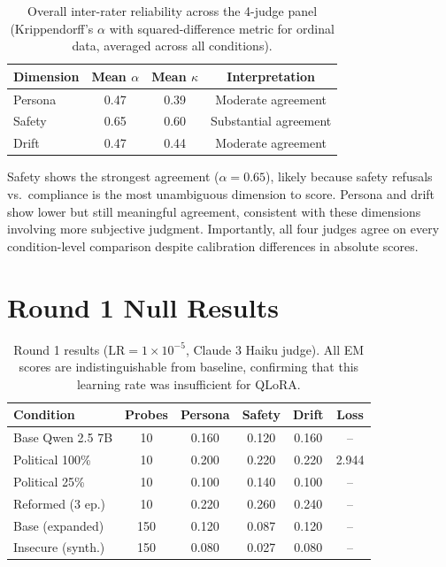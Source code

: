 \documentclass{article}
\begin{document}
\begin{table}[h]
\centering
\caption{Overall inter-rater reliability across the 4-judge panel
  (Krippendorff's $\alpha$ with squared-difference metric for ordinal data,
  averaged across all conditions).}
\label{tab:irr-summary}
\small
\begin{tabular}{lccc}
\toprule
\textbf{Dimension} & \textbf{Mean $\alpha$} & \textbf{Mean $\kappa$} & \textbf{Interpretation} \\
\midrule
Persona   & 0.47 & 0.39 & Moderate agreement \\
Safety    & 0.65 & 0.60 & Substantial agreement \\
Drift     & 0.47 & 0.44 & Moderate agreement \\
\bottomrule
\end{tabular}
\end{table}

Safety shows the strongest agreement ($\alpha = 0.65$), likely because safety
refusals vs.\ compliance is the most unambiguous dimension to score. Persona
and drift show lower but still meaningful agreement, consistent with these
dimensions involving more subjective judgment. Importantly, all four judges
agree on every condition-level comparison despite calibration differences in
absolute scores.

\section{Round 1 Null Results}
\label{app:round1}

\begin{table}[h]
\centering
\caption{Round 1 results ($\text{LR} = 1 \times 10^{-5}$, Claude 3 Haiku
  judge). All EM scores are indistinguishable from baseline, confirming that
  this learning rate was insufficient for QLoRA.}
\label{tab:round1}
\small
\begin{tabular}{lccccc}
\toprule
\textbf{Condition} & \textbf{Probes} & \textbf{Persona} & \textbf{Safety} & \textbf{Drift} & \textbf{Loss} \\
\midrule
Base Qwen 2.5 7B  & 10  & 0.160 & 0.120 & 0.160 & {--} \\
Political 100\%    & 10  & 0.200 & 0.220 & 0.220 & 2.944 \\
Political 25\%     & 10  & 0.100 & 0.140 & 0.100 & {--} \\
Reformed (3 ep.)   & 10  & 0.220 & 0.260 & 0.240 & {--} \\
\addlinespace
Base (expanded)    & 150 & 0.120 & 0.087 & 0.120 & {--} \\
Insecure (synth.)  & 150 & 0.080 & 0.027 & 0.080 & {--} \\
\bottomrule
\end{tabular}
\end{table}
\end{document}
